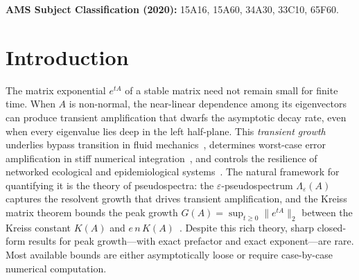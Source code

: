 \documentclass[11pt,reqno]{article}
\theoremstyle{plain}
\theoremstyle{definition}
\theoremstyle{remark}
\numberwithin{equation}{section}
\begin{document}
\vspace{0.4em}
\noindent\textbf{AMS Subject Classification (2020):} 15A16, 15A60, 34A30, 33C10, 65F60.

\vspace{1.2em}

\section{Introduction}\label{sec:intro}

The matrix exponential $e^{tA}$ of a stable matrix need not remain small for finite time. When $A$ is non-normal, the near-linear dependence among its eigenvectors can produce transient amplification that dwarfs the asymptotic decay rate, even when every eigenvalue lies deep in the left half-plane. This \emph{transient growth} underlies bypass transition in fluid mechanics~\cite{Trefethen1993}, determines worst-case error amplification in stiff numerical integration~\cite{Higham2008,vanDorsselaer1993}, and controls the resilience of networked ecological and epidemiological systems~\cite{Neubert1997}. The natural framework for quantifying it is the theory of pseudospectra: the $\varepsilon$-pseudospectrum $\Lambda_\varepsilon(A)$ captures the resolvent growth that drives transient amplification, and the Kreiss matrix theorem bounds the peak growth $G(A) = \sup_{t \ge 0} \|e^{tA}\|_2$ between the Kreiss constant $K(A)$ and $e\,n\,K(A)$~\cite{Kreiss1962,Spijker1991,Trefethen2005}. Despite this rich theory, sharp closed-form results for peak growth---with exact prefactor and exact exponent---are rare. Most available bounds are either asymptotically loose or require case-by-case numerical computation.
\end{document}
